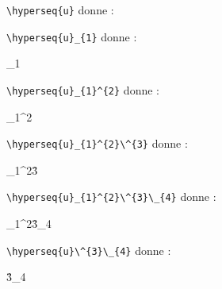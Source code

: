 \documentclass[varwidth, border = 3pt]{standalone}
\begin{document}
\verb#\hyperseq{u}# donne :



\verb#\hyperseq{u}_{1}# donne :

_{1}


\verb#\hyperseq{u}_{1}^{2}# donne :

_{1}^{2}


\verb#\hyperseq{u}_{1}^{2}\^{3}# donne :

_{1}^{2}\^{3}


\verb#\hyperseq{u}_{1}^{2}\^{3}\_{4}# donne :

_{1}^{2}\^{3}\_{4}


\verb#\hyperseq{u}\^{3}\_{4}# donne :

\^{3}\_{4}
\end{document}
